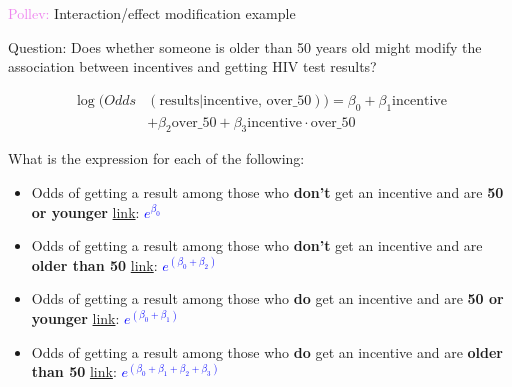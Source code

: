 \documentclass[10pt,t]{beamer}
\begin{document}
\begin{frame}{\textcolor{violet}{Pollev:} Interaction/effect modification example}
	
	\vspace{-5 mm}
	
	Question: Does whether someone is older than 50 years old might modify the association between incentives and getting HIV test results?
	
	
	\vspace{-3 mm}
	
	\color{blue}
	\begin{align*}
	\log(Odds&(\text{results}|\text{incentive, over\_50})) = \beta_0 + \beta_1\text{incentive}\\&+\beta_2\text{over\_50}+\beta_3\text{incentive}\cdot\text{over\_50}
	\end{align*}
	\color{black}
	
	\vspace{-2 mm}
	
	What is the expression for each of the following:
	
	\medskip
	
	\begin{itemize}
		\item Odds of getting a result among those who \textbf{don't} get an incentive and are \textbf{50 or younger}  \textcolor{purple}{\href{https://PollEv.com/multiple_choice_polls/1LE88Rsf2hnEYB0ktPIbl/respond}{link}}: \textcolor{blue}{$e^{\beta_0}$}
		
		\medskip
		
		\item Odds of getting a result among those who \textbf{don't} get an incentive and are \textbf{older than 50}  \textcolor{purple}{\href{https://PollEv.com/multiple_choice_polls/hSAtrOO3BuKbqy5zdGwch/respond}{link}}: \textcolor{blue}{$e^{(\beta_0+\beta_2)}$}
		
		\medskip
		
		\item Odds of getting a result among those who \textbf{do} get an incentive and are \textbf{50 or younger}  \textcolor{purple}{\href{https://PollEv.com/multiple_choice_polls/E513SDYKPbxFENUWdq6Ly/respond}{link}}:   \textcolor{blue}{$e^{(\beta_0+\beta_1)}$}
		
		\medskip
		
		\item Odds of getting a result among those who \textbf{do} get an incentive and are \textbf{older than 50} \textcolor{purple}{\href{https://PollEv.com/multiple_choice_polls/1L1S08HSw3G4P1isemgIt/respond}{link}}:  \textcolor{blue}{$e^{(\beta_0+\beta_1 + \beta_2 +\beta_3)}$}
		
		
		
	\end{itemize}
	
\end{frame}
\end{document}
